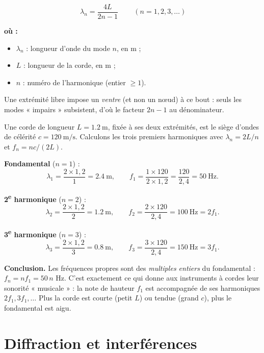 \documentclass[11pt,a4paper]{article}
\newenvironment{ou}{%
  \par\smallskip\noindent\textbf{où :}\nopagebreak
  \begin{itemize}[leftmargin=1.8em,topsep=2pt,itemsep=1.5pt,parsep=0pt]}%
  {\end{itemize}}
\begin{document}
\begin{formule}
\[ \boxed{\,\lambda_n = \frac{4L}{2n-1}\,}\qquad (n = 1,2,3,\dots) \]
\begin{ou}
  \item $\lambda_n$ : longueur d'onde du mode $n$, en \si{\metre} ;
  \item $L$ : longueur de la corde, en \si{\metre} ;
  \item $n$ : numéro de l'harmonique (entier $\ge 1$).
\end{ou}
Une extrémité libre impose un \emph{ventre} (et non un nœud) à ce bout : seuls les modes
« impairs » subsistent, d'où le facteur $2n-1$ au dénominateur.
\end{formule}

\begin{exemple}
Une corde de longueur $L = \SI{1.2}{\metre}$, fixée à ses deux extrémités, est le siège d'ondes
de célérité $c = \SI{120}{\metre\per\second}$. Calculons les trois premiers harmoniques avec
$\lambda_n = 2L/n$ et $f_n = nc/(2L)$.

\smallskip
\textbf{Fondamental} ($n=1$) :
\[ \lambda_1 = \frac{2\times 1{,}2}{1} = \SI{2.4}{\metre},\qquad
   f_1 = \frac{1\times 120}{2\times 1{,}2} = \frac{120}{2{,}4} = \SI{50}{\hertz}. \]

\textbf{2\textsuperscript{e} harmonique} ($n=2$) :
\[ \lambda_2 = \frac{2\times 1{,}2}{2} = \SI{1.2}{\metre},\qquad
   f_2 = \frac{2\times 120}{2{,}4} = \SI{100}{\hertz} = 2 f_1. \]

\textbf{3\textsuperscript{e} harmonique} ($n=3$) :
\[ \lambda_3 = \frac{2\times 1{,}2}{3} = \SI{0.8}{\metre},\qquad
   f_3 = \frac{3\times 120}{2{,}4} = \SI{150}{\hertz} = 3 f_1. \]

\smallskip
\textbf{Conclusion.} Les fréquences propres sont des \emph{multiples entiers} du fondamental :
$f_n = n f_1 = 50\,n$ \si{\hertz}. C'est exactement ce qui donne aux instruments à cordes leur
sonorité « musicale » : la note de hauteur $f_1$ est accompagnée de ses harmoniques
$2f_1, 3f_1,\dots$ Plus la corde est courte (petit $L$) ou tendue (grand $c$), plus le
fondamental est aigu.
\end{exemple}

\section{Diffraction et interférences}
\end{document}
